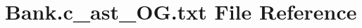 \hypertarget{Bank_8c__ast__OG_8txt}{}\section{Bank.\+c\+\_\+ast\+\_\+\+O\+G.\+txt File Reference}
\label{Bank_8c__ast__OG_8txt}
